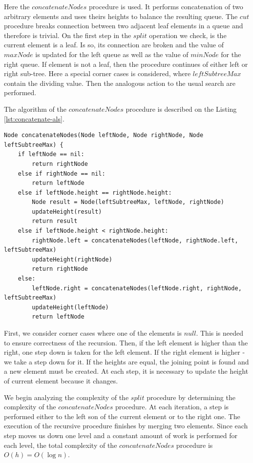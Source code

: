 \documentclass[a4paper,english,numberwithinsect,notab]{eurocg20-submission}
\begin{document}
	Here the $concatenateNodes$ procedure is used. It performs concatenation of two arbitrary elements and uses theirs heights to balance the resulting queue. The $cut$ procedure breaks connection between two adjacent leaf elements in a queue and therefore is trivial. On the first step in the $split$ operation we check, is the current element is a leaf. Is so, its connection are broken and the value of $maxNode$ is updated for the left queue as well as the value of $minNode$ for the right queue. If element is not a leaf, then the procedure continues of either left or right sub-tree. Here a special corner cases is considered, where $leftSubtreeMax$ contain the dividing value. Then the analogous action to the usual search are performed.
	
	The algorithm of the $concatenateNodes$ procedure is described on the Listing \ref{lst:concatenate-als}.
	
	\begin{lstlisting}[caption={Merging two queues},label={lst:concatenate-als},captionpos=b]
Node concatenateNodes(Node leftNode, Node rightNode, Node leftSubtreeMax) {
    if leftNode == nil:
        return rightNode
    else if rightNode == nil:
        return leftNode
    else if leftNode.height == rightNode.height:
        Node result = Node(leftSubtreeMax, leftNode, rightNode)
        updateHeight(result)
        return result
    else if leftNode.height < rightNode.height:
        rightNode.left = concatenateNodes(leftNode, rightNode.left, leftSubtreeMax)
        updateHeight(rightNode)
        return rightNode
    else:
        leftNode.right = concatenateNodes(leftNode.right, rightNode, leftSubtreeMax)
        updateHeight(leftNode)
        return leftNode
	\end{lstlisting}
	
	First, we consider corner cases where one of the elements is $null$. This is needed to ensure correctness of the recursion. Then, if the left element is higher than the right, one step down is taken for the left element. If the right element is higher - we take a step down for it. If the heights are equal, the joining point is found and a new element must be created. At each step, it is necessary to update the height of current element because it changes.
	
	We begin analyzing the complexity of the $split$ procedure by determining the complexity of the $concatenateNodes$ procedure. At each iteration, a step is performed either to the left son of the current element or to the right one. The execution of the recursive procedure finishes by merging two elements. Since each step moves us down one level and a constant amount of work is performed for each level, the total complexity of the $concatenateNodes$ procedure is $O(h)=O(\log n)$.
	
\end{document}
